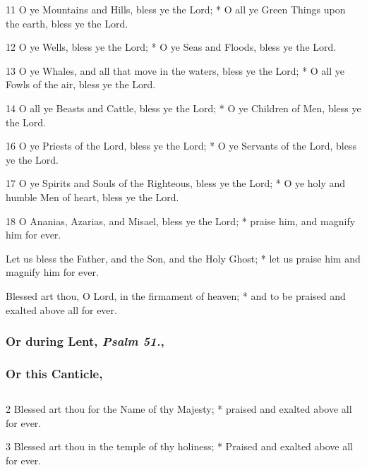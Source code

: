 
11 O ye Mountains and Hills, bless ye the Lord; * O all ye Green Things upon the earth, bless ye the Lord.

12 O ye Wells, bless ye the Lord; * O ye Seas and Floods, bless ye the Lord.

13 O ye Whales, and all that move in the waters, bless ye the Lord; * O all ye Fowls of the air, bless ye the Lord.

14 O all ye Beasts and Cattle, bless ye the Lord; * O ye Children of Men, bless ye the Lord.


16 O ye Priests of the Lord, bless ye the Lord; * O ye Servants of the Lord, bless ye the Lord.

17 O ye Spirits and Souls of the Righteous, bless ye the Lord; * O ye holy and humble Men of heart, bless ye the Lord.

18 O Ananias, Azarias, and Misael, bless ye the Lord; * praise him, and magnify him for ever.

Let us bless the Father, and the Son, and the Holy Ghost; * let us praise him and magnify him for ever.

Blessed art thou, O Lord, in the firmament of heaven; * and to be praised and exalted above all for ever.

\subsubsection{Or during Lent, \emph{Psalm 51.},}
\subsubsection{Or this Canticle,}

\subsection{}

2 Blessed art thou for the Name of thy Majesty; * praised and exalted above all for ever.

3 Blessed art thou in the temple of thy holiness; * Praised and exalted above all for ever.


